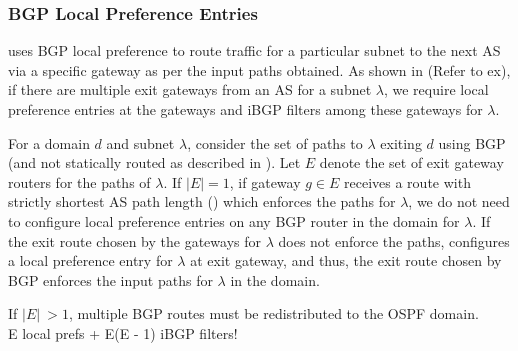 \subsubsection{BGP Local Preference Entries}
\name uses BGP local preference to route traffic
for a particular subnet to the next AS via a specific 
gateway as per the input paths obtained. 
As shown in \Cref{} (Refer
to ex), if there are multiple exit gateways from an AS 
for a subnet $\lambda$, we require local preference entries at the 
gateways and iBGP filters among these gateways for $\lambda$.

For a domain $d$ and subnet $\lambda$, consider the set 
of paths to $\lambda$ exiting $d$ using BGP (and not statically
routed as described in ). Let $E$ denote the
set of exit gateway routers for the paths of $\lambda$. 
If $|E| = 1$, if gateway $g \in E$ receives a route with 
strictly shortest AS path length () 
which enforces the paths
for $\lambda$, we do not need to configure local preference
entries on any BGP router in the domain for $\lambda$. If
the exit route chosen by the gateways for $\lambda$ does not 
enforce the paths, \name configures a local preference entry
for $\lambda$ at exit gateway, and thus, the exit route chosen
by BGP enforces the input paths for $\lambda$ in the domain.

If $|E| ~> 1$, multiple BGP routes must be redistributed to 
the OSPF domain. \\
E local prefs + E(E - 1) iBGP filters!


